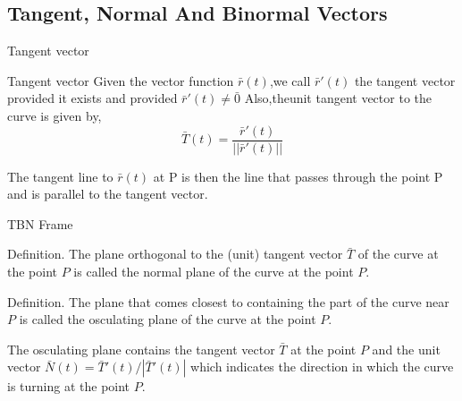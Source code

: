 \documentclass{beamer}
\begin{document}
\subsection{Tangent, Normal And Binormal Vectors}

\begin{frame}[t]{Tangent vector}
    \begin{block}{Tangent vector}
    Given the vector function $\bar{r}(t)$,we call $\bar{r}'(t)$ the \textcolor{yy}{tangent vector} provided it exists and provided $\bar{r}'(t) \neq \bar{0}$
    Also,the\textcolor{yy}{unit tangent vector}  to the curve is given by,
    \begin{equation*}
        \bar{T}(t) = \frac{\bar{r}'(t)}{||\bar{r}'(t)||}
    \end{equation*}
    
    The tangent line to $\bar{r}(t)$ at P
is then the line that passes through the point P and is parallel to the tangent vector.
    \end{block}
\end{frame}

\begin{frame}[t]{TBN Frame}
        \begin{block}
            \par \textcolor{yy}{Definition.} The plane orthogonal to the (unit) tangent vector $\bar{T}$ of the curve at the point $P$ is called the \textcolor{yy}{normal plane} of the curve at the point $P$.

            \phantom{zjy}

            \par \textcolor{yy}{Definition.} The plane that comes closest to containing the part of the curve near $P$ is called the \textcolor{yy}{osculating plane} of the curve at the point $P$. 
        \end{block}

        \phantom{zjy}

        \par The osculating plane contains the tangent vector $\bar{T}$ at the point $P$ and the unit vector $\bar{N} (t) = \bar{T}'(t) / |\bar{T}'(t)|$ which indicates the direction in which the curve is turning at the point $P$.
    \end{frame}
\end{document}
